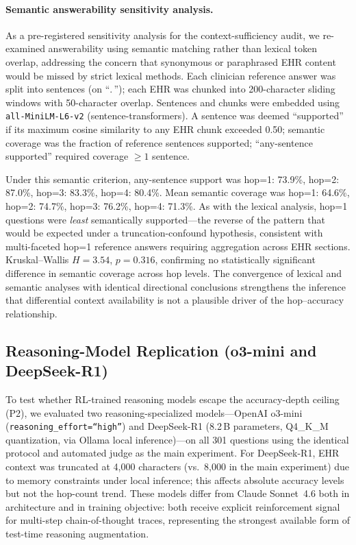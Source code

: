 \documentclass{article}
\begin{document}
\paragraph{Semantic answerability sensitivity analysis.}
As a pre-registered sensitivity analysis for the context-sufficiency audit, we re-examined answerability using semantic matching rather than lexical token overlap, addressing the concern that synonymous or paraphrased EHR content would be missed by strict lexical methods. Each clinician reference answer was split into sentences (on ``$.\,$''); each EHR was chunked into 200-character sliding windows with 50-character overlap. Sentences and chunks were embedded using \texttt{all-MiniLM-L6-v2} (sentence-transformers). A sentence was deemed ``supported'' if its maximum cosine similarity to any EHR chunk exceeded 0.50; semantic coverage was the fraction of reference sentences supported; ``any-sentence supported'' required coverage $\geq 1$ sentence.

Under this semantic criterion, any-sentence support was hop=1: 73.9\%, hop=2: 87.0\%, hop=3: 83.3\%, hop=4: 80.4\%. Mean semantic coverage was hop=1: 64.6\%, hop=2: 74.7\%, hop=3: 76.2\%, hop=4: 71.3\%. As with the lexical analysis, hop=1 questions were \emph{least} semantically supported---the reverse of the pattern that would be expected under a truncation-confound hypothesis, consistent with multi-faceted hop=1 reference answers requiring aggregation across EHR sections. Kruskal--Wallis $H = 3.54$, $p = 0.316$, confirming no statistically significant difference in semantic coverage across hop levels. The convergence of lexical and semantic analyses with identical directional conclusions strengthens the inference that differential context availability is not a plausible driver of the hop--accuracy relationship.

\subsection{Reasoning-Model Replication (o3-mini and DeepSeek-R1)}
\label{app:reasoning_models}

To test whether RL-trained reasoning models escape the accuracy-depth ceiling (P2), we evaluated two reasoning-specialized models---OpenAI o3-mini (\texttt{reasoning\_effort=``high''}) and DeepSeek-R1 (8.2\,B parameters, Q4\_K\_M quantization, via Ollama local inference)---on all 301 questions using the identical protocol and automated judge as the main experiment. For DeepSeek-R1, EHR context was truncated at 4{,}000 characters (vs.\ 8{,}000 in the main experiment) due to memory constraints under local inference; this affects absolute accuracy levels but not the hop-count trend. These models differ from Claude Sonnet~4.6 both in architecture and in training objective: both receive explicit reinforcement signal for multi-step chain-of-thought traces, representing the strongest available form of test-time reasoning augmentation.
\end{document}
